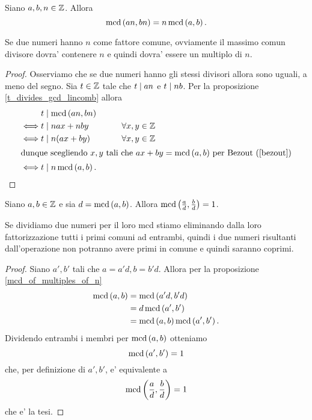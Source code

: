 \begin{proposition} \label{mcd_of_multiples_of_n}
    Siano $a, b, n \in \mathbb{Z}$. Allora \begin{equation}
        \operatorname{mcd}\left(an, bn\right) = n\operatorname{mcd}\left(a, b\right).
    \end{equation}
\end{proposition}
\begin{intuition}
    Se due numeri hanno $n$ come fattore comune, ovviamente il massimo comun divisore dovra' contenere $n$ e quindi dovra' essere un multiplo di $n$.
\end{intuition}
\begin{proof}
    Osserviamo che se due numeri hanno gli stessi divisori allora sono uguali, a meno del segno.
    Sia $t \in \mathbb{Z}$ tale che $t \mid an$ e $t \mid nb$. Per la proposizione \ref{t_divides_gcd_lincomb} allora 
    \begin{alignat*}
        {2}
        &t \mid \operatorname{mcd}\left(an, bn\right)\\
        \iff &t \mid nax + nby      \qquad& \forall x, y \in \mathbb{Z} \\
        \iff &t \mid n(ax + by)     \qquad& \forall x, y \in \mathbb{Z} \\
        \intertext{dunque scegliendo $x, y$ tali che $ax+by = \operatorname{mcd}\left(a, b\right)$ per Bezout (\ref{bezout})}
        \iff &t \mid n\operatorname{mcd}\left(a, b\right). \tag*{\qedhere}
    \end{alignat*}
\end{proof}


\begin{corollary} \label{mcd_diviso_mcd}
    Siano $a, b \in \mathbb{Z}$ e sia $d = \operatorname{mcd}\left(a, b\right)$. Allora $\operatorname{mcd}\left(\frac{a}{d}, \frac{b}{d}\right) = 1$.
\end{corollary}
\begin{intuition}
    Se dividiamo due numeri per il loro mcd stiamo eliminando dalla loro fattorizzazione tutti i primi comuni ad entrambi, quindi i due numeri risultanti dall'operazione non potranno avere primi in comune e quindi saranno coprimi.
\end{intuition}
\begin{proof}
    Siano $a', b'$ tali che $a = a'd, b = b'd$. Allora per la proposizione \ref{mcd_of_multiples_of_n}
    \begin{alignat*}{1}
        \operatorname{mcd}\left(a, b\right) &= \operatorname{mcd}\left(a'd, b'd\right) \\
                   &= d\operatorname{mcd}\left(a', b'\right) \\
                   &= \operatorname{mcd}\left(a, b\right) \operatorname{mcd}\left(a', b'\right).
        \end{alignat*} 
    Dividendo entrambi i membri per $\operatorname{mcd}\left(a, b\right)$ otteniamo \[
        \operatorname{mcd}\left(a', b'\right) = 1 
    \]
    che, per definizione di $a', b'$, e' equivalente a \[
        \operatorname{mcd}\left(\frac{a}{d}, \frac{b}{d}\right) = 1
    \]
    che e' la tesi.
\end{proof}

